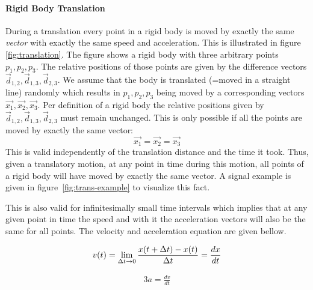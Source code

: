 \paragraph{Rigid Body Translation}
During a translation every point in a 
rigid body is moved by exactly the same {\em vector} with exactly the
same speed and acceleration. 
This is illustrated in figure \ref{fig:translation}. The figure shows a rigid body
with three arbitrary points $p_1,p_2,p_3$. The relative
positions of those points are given by the difference vectors
$\vec{d}_{1,2},\vec{d}_{1,3},\vec{d}_{2,3}$. We assume that the body is
translated (=moved in a straight line) randomly which
results in  $p_1,p_2,p_3$  being moved by a corresponding
vectors $\vec{x_1}, \vec{x_2},\vec{x_3}$.  Per definition of a rigid body 
the relative positions given 
by $\vec{d}_{1,2},\vec{d}_{1,3},\vec{d}_{2,3}$ must
remain unchanged. This is only possible if all the points are moved
by exactly the same vector:
\begin{equation}
\vec{x_1}=\vec{x_2}=\vec{x_3}
\end{equation}
 This is valid
independently of the translation distance and the time it
took. Thus, given a translatory motion, at any point in time during
this motion, all points of a rigid body will have moved by
exactly the same vector. A signal example is given in figure~\ref{fig:trans-example}
to visualize this fact.

This is also valid for infinitesimally small
time intervals which implies that at any given point in time the speed
and with it the acceleration vectors will also be the same for all points.
The velocity and acceleration equation are given bellow.

\begin{equation}
v(t) = {\lim_{\Delta t \to 0}{{x(t+\Delta t)-x(t)} \over \Delta t}={{d}x \over dt}}
\end{equation}


\begin{alignat}{3}
a = \frac{d v}{dt} 
 \end{alignat}


